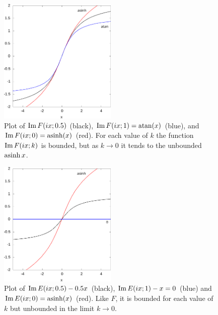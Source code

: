 \documentclass{article}
\begin{document}
\begin{figure}
\includegraphics[width=0.5\textwidth]{graphics/elliptic_bounds_F0.png}
\caption{Plot of $\operatorname{Im} F(i x;0.5)$ (black), $\operatorname{Im} F(i x;1) = \operatorname{atan}(x)$ (blue), and $\operatorname{Im} F(i x;0)=\operatorname{asinh}(x)$ (red). For each value of $k$ the function $\operatorname{Im} F(i x;k)$ is bounded, but as $k\to 0$ it tends to the unbounded $\operatorname{asinh} x$.}
\end{figure}
\begin{figure}
\includegraphics[width=0.5\textwidth]{graphics/elliptic_bounds_E0.png}
\caption{Plot of $\operatorname{Im} E(i x; 0.5) - 0.5x$ (black), $\operatorname{Im} E(i x; 1) - x = 0$ (blue) and $\operatorname{Im} E(i x; 0)=\operatorname{asinh}(x)$ (red). Like $F$, it is bounded for each value of $k$ but unbounded in the limit $k \to 0$.}
\end{figure}
\end{document}
